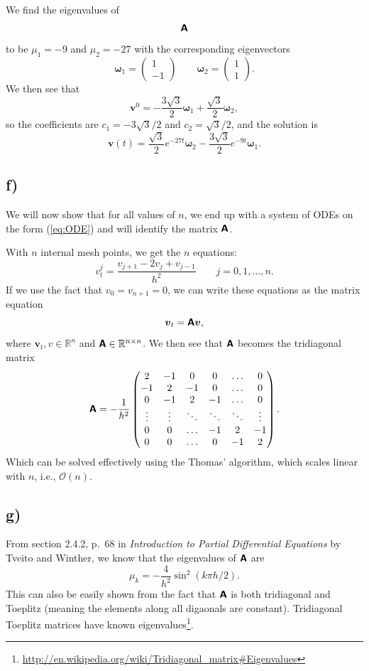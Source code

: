 \documentclass[a4paper, 11pt, notitlepage, english]{article}
\newcommand{\bt}[1]{\boldsymbol{#1}}
\newcommand{\mat}[1]{\textsf{\textbf{#1}}}
\begin{document}
We find the eigenvalues of $$\mat{A}$$ to be $\mu_1 = -9$ and $\mu_2 = -27$ with the corresponding eigenvectors
$$\bt{\omega}_1 = \begin{pmatrix} 1\\ -1 \end{pmatrix} \qquad \bt{\omega}_2 = \begin{pmatrix} 1\\ 1 \end{pmatrix} .$$
We then see that
$$\bt{v}^0 = -\frac{3\sqrt{3}}{2} \bt{\omega}_1 + \frac{\sqrt{3}}{2}\bt{\omega}_2,$$
so the coefficients are $c_1 = -3\sqrt{3}/2$ and $c_2 = \sqrt{3}/2$, and the solution is
$$\bt{v}(t) = \frac{\sqrt{3}}{2}e^{-27t}\bt{\omega}_2 - \frac{3\sqrt{3}}{2}e^{-9t}\bt{\omega}_1.$$

\clearpage

\subsection*{f)}
We will now show that for all values of $n$, we end up with a system of ODEs on the form (\ref{eq:ODE}) and will identify the matrix $\mat{A}$.

With $n$ internal mesh points, we get the $n$ equations:
$$v^j_t = \frac{v_{j+1} - 2v_j + v_{j-1}}{h^2} \qquad j=0,1,\ldots,n.$$
If we use the fact that $v_0 = v_{n+1} = 0$, we can write these equations as the matrix equation
$$\bt{v}_t = \mat{A}\bt{v},$$
where $\bt{v}_t, v \in \mathbb{R}^n$ and $\mat{A}\in \mathbb{R}^{n\times n}$. We then see that $\mat{A}$ becomes the tridiagonal matrix
$$\mat{A} = -\frac{1}{h^2}\begin{pmatrix}
    2 & -1 & 0 & 0 & \ldots & 0 \\
    -1 & 2 & -1 & 0 &\ldots & 0 \\
    0 & -1 & 2 & -1 & \ldots & 0 \\
    \vdots & \vdots & \ddots & \ddots & \ddots & \vdots \\
    0 & 0 & \ldots & -1 & 2 & -1 \\
    0 & 0 & \ldots & 0 & -1 & 2
\end{pmatrix}. $$
Which can be solved effectively using the Thomas' algorithm, which scales linear with $n$, i.e., $\mathcal{O}(n)$.

\subsection*{g)}
From section 2.4.2, p.\ 68 in \emph{Introduction to Partial Differential Equations} by Tveito and Winther, we know that the eigenvalues of $\mat{A}$ are
$$\mu_k = -\frac{4}{h^2}\sin^2(k\pi h/2).$$
This can also be easily shown from the fact that $\mat{A}$ is both tridiagonal and Toeplitz (meaning the elements along all digaonals are constant). Tridiagonal Toeplitz matrices have known eigenvalues\footnote{\url{http://en.wikipedia.org/wiki/Tridiagonal_matrix#Eigenvalues}}. 
\end{document}
